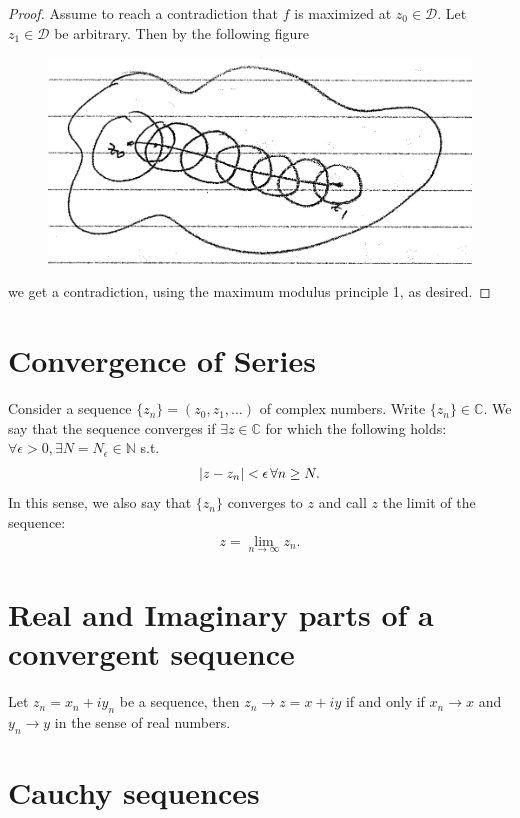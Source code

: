 \documentclass{article}
\theoremstyle{definition}
\newcommand{\C}{\mathbb{C}}
\begin{document}
\begin{proof}
	Assume to reach a contradiction that $f$ is maximized at $z_0 \in \mathcal{D}$. Let $z_1 \in \mathcal{D}$ be arbitrary. Then by the following figure
	\begin{figure}[!htb]
		\centering
		\includegraphics[scale=0.25]{max-mod}
	\end{figure}


	we get a contradiction, using the maximum modulus principle 1, as desired.  
\end{proof}




\section{Convergence of Series}

Consider a sequence $\{z_n\} = (z_0, z_1, \dots)$ of complex numbers. Write $\{z_n\} \in \C$. We say that the sequence converges if $\exists z \in \C$ for which the following holds: $\forall \epsilon > 0, \exists N = N_\epsilon \in \mathbb{N}$ s.t.
\begin{align}
\abs{z - z_n} < \epsilon\, \forall n \geq N.
\end{align}
In this sense, we also say that $\{z_n\}$ converges to $z$ and call $z$ the limit of the sequence:
\begin{align}
z = \lim_{n\to \infty} z_n.
\end{align}

\section{Real and Imaginary parts of a convergent sequence}
Let $z_n = x_n + iy_n$ be a sequence, then $z_n \to z = x+ iy$ if and only if $x_n \to x$ and $y_n \to y$ in the sense of real numbers. 

\section{Cauchy sequences}
\end{document}
